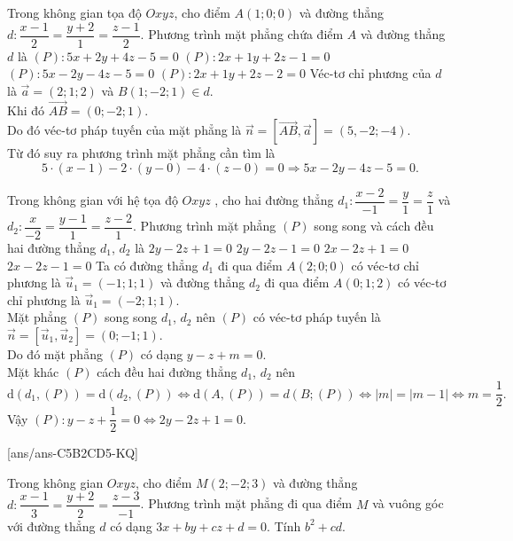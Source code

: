 \begin{ex}%
	Trong không gian tọa độ $ Oxyz$, cho điểm $A(1;0;0)$ và đường thẳng \break $ d\colon\dfrac{x-1}{2}=\dfrac{y+2}{1}=\dfrac{z-1}{2}$. Phương trình mặt phẳng chứa điểm $A$ và đường thẳng $d$ là
	\choice
	{$(P)\colon 5x+2y+4z-5=0$}
	{$(P)\colon 2x+1y+2z-1=0$}
	{\True $(P)\colon 5x-2y-4z-5=0$}
	{$(P)\colon 2x+1y+2z-2=0$}
	\loigiai
	{
		Véc-tơ chỉ phương của $ d$ là $\overrightarrow{a}=(2; 1; 2)$ và $ B(1; -2; 1)\in d$.\\
		Khi đó $\overrightarrow{AB}=(0; -2; 1)$.\\
		Do đó véc-tơ pháp tuyến của mặt phẳng là $\overrightarrow{n}=\left[\overrightarrow{AB},\overrightarrow{a}\right]=(5,-2;-4)$.\\
		Từ đó suy ra phương trình mặt phẳng cần tìm là $$ 5\cdot(x-1)-2\cdot(y-0)-4\cdot(z-0)=0\Rightarrow 5x-2y-4z-5=0.$$}
\end{ex}

\begin{ex}%
	Trong không gian với hệ tọa độ $Oxyz$ , cho hai đường thẳng $d_1\colon\dfrac{x-2}{-1}=\dfrac{y}{1}=\dfrac{z}{1}$ và $d_2\colon\dfrac{x}{-2}=\dfrac{y-1}{1}=\dfrac{z-2}{1}$. Phương trình mặt phẳng $(P)$ song song và cách đều hai đường thẳng $d_1$, ${d_2}$ là
	\choice
	{\True $ 2y-2z+1=0$}
	{$ 2y-2z-1=0$}
	{$2x-2z+1=0$}
	{$2x-2z-1=0$}
	\loigiai
	{
		Ta có đường thẳng $d_1$ đi qua điểm $ A(2;0;0)$ có véc-tơ chỉ phương là $\overrightarrow{u}_1=(-1;1;1)$ và đường thẳng $d_2$ đi qua điểm $ A(0;1;2)$ có véc-tơ chỉ phương là $\overrightarrow{u}_1=(-2; 1; 1)$.\\
		Mặt phẳng $(P)$ song song $d_1$, ${d_2}$ nên $(P)$ có véc-tơ pháp tuyến là $\overrightarrow{n}=\left[\overrightarrow{u}_1,\overrightarrow{u}_2\right]=(0;-1;1)$.\\
		Do đó mặt phẳng $(P)$ có dạng $ y-z+m=0$.\\
		Mặt khác $(P)$ cách đều hai đường thẳng $d_1$, ${d_2}$ nên\\
		$$ \mathrm{d}\left(d_1,(P)\right)=\mathrm{d}\left(d_2,(P)\right)\Leftrightarrow \mathrm{d}\left(A,(P)\right)=d\left(B;(P)\right)\Leftrightarrow\left| m\right|=\left| m-1\right|\Leftrightarrow m=\dfrac{1}{2}.$$
		Vậy $(P)\colon y-z+\dfrac{1}{2}=0\Leftrightarrow 2y-2z+1=0$.}
\end{ex}
\TNSA
{}[ans/ans-C5B2CD5-KQ]
\begin{ex}%
	Trong không gian $Oxyz$, cho điểm $M(2; -2; 3)$ và đường thẳng \break $d\colon \dfrac{x-1}{3}=\dfrac{y+2}{2}=\dfrac{z-3}{-1}$. Phương trình mặt phẳng đi qua điểm $M$ và vuông góc với đường thẳng $d$ có dạng $3x+by+cz+d=0$. Tính $b^2+cd$.
\end{ex}

